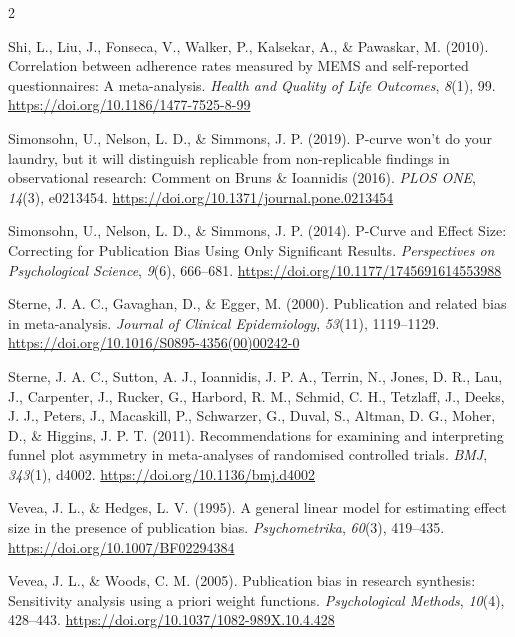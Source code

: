 \documentclass[
  bookmarksnumbered]{article}
\newlength{\cslhangindent}
\newlength{\cslentryspacingunit} %
\newenvironment{CSLReferences}[2] %
 {%
  \setlength{\parindent}{0pt}
  \ifodd #1
  \let\oldpar\par
  \def\par{\hangindent=\cslhangindent\oldpar}
  \fi
  \setlength{\parskip}{#2\cslentryspacingunit}
 }%
 {}
\begin{document}
\begin{multicols}{2}
\begin{CSLReferences}{1}{0}
\leavevmode{}%
Shi, L., Liu, J., Fonseca, V., Walker, P., Kalsekar, A., \& Pawaskar, M. (2010). Correlation between adherence rates measured by {MEMS} and self-reported questionnaires: A meta-analysis. \emph{Health and Quality of Life Outcomes}, \emph{8}(1), 99. \url{https://doi.org/10.1186/1477-7525-8-99}

\leavevmode{}%
Simonsohn, U., Nelson, L. D., \& Simmons, J. P. (2019). P-curve won't do your laundry, but it will distinguish replicable from non-replicable findings in observational research: {Comment} on {Bruns} \& {Ioannidis} (2016). \emph{PLOS ONE}, \emph{14}(3), e0213454. \url{https://doi.org/10.1371/journal.pone.0213454}

\leavevmode{}%
Simonsohn, U., Nelson, L. D., \& Simmons, J. P. (2014). P-{Curve} and {Effect Size}: {Correcting} for {Publication Bias Using Only Significant Results}. \emph{Perspectives on Psychological Science}, \emph{9}(6), 666--681. \url{https://doi.org/10.1177/1745691614553988}

\leavevmode{}%
Sterne, J. A. C., Gavaghan, D., \& Egger, M. (2000). Publication and related bias in meta-analysis. \emph{Journal of Clinical Epidemiology}, \emph{53}(11), 1119--1129. \url{https://doi.org/10.1016/S0895-4356(00)00242-0}

\leavevmode{}%
Sterne, J. A. C., Sutton, A. J., Ioannidis, J. P. A., Terrin, N., Jones, D. R., Lau, J., Carpenter, J., Rucker, G., Harbord, R. M., Schmid, C. H., Tetzlaff, J., Deeks, J. J., Peters, J., Macaskill, P., Schwarzer, G., Duval, S., Altman, D. G., Moher, D., \& Higgins, J. P. T. (2011). Recommendations for examining and interpreting funnel plot asymmetry in meta-analyses of randomised controlled trials. \emph{BMJ}, \emph{343}(1), d4002. \url{https://doi.org/10.1136/bmj.d4002}

\leavevmode{}%
Vevea, J. L., \& Hedges, L. V. (1995). A general linear model for estimating effect size in the presence of publication bias. \emph{Psychometrika}, \emph{60}(3), 419--435. \url{https://doi.org/10.1007/BF02294384}

\leavevmode{}%
Vevea, J. L., \& Woods, C. M. (2005). Publication bias in research synthesis: Sensitivity analysis using a priori weight functions. \emph{Psychological Methods}, \emph{10}(4), 428--443. \url{https://doi.org/10.1037/1082-989X.10.4.428}


\end{CSLReferences}
\end{multicols}
\end{document}
